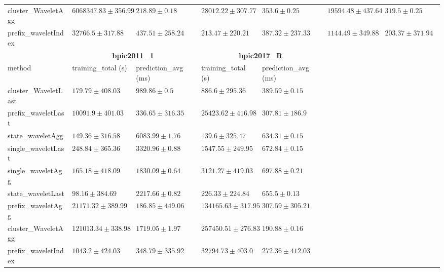 \documentclass[twoside,11pt]{Latex/Classes/PhDthesisPSnPDF}
\begin{document}
\begin{table}[h]
{\begin{tabular}{llllllll}
	cluster\_WaveletAgg & $6068347.83 \pm 356.99$ & $\mathbf{218.89 \pm 0.18}$ & $28012.22 \pm 307.77$ & $353.6 \pm 0.25$ & $19594.48 \pm 437.64$ & $319.5 \pm 0.25$ \\ 
	prefix\_waveletIndex & $32766.5 \pm 317.88$ & $437.51 \pm 258.24$ & $213.47 \pm 220.21$ & $387.32 \pm 237.33$ & $1144.49 \pm 349.88$ & $\mathbf{203.37 \pm 371.94}$ \\ 
	\bottomrule
	\toprule
	& \multicolumn{2}{c}{{\bfseries bpic2011\_1}} & \multicolumn{2}{c}{{\bfseries bpic2017\_R}} \\ \cmidrule(lr){2-3} \cmidrule(lr){4-5} \cmidrule(lr){6-7}
	method  & training\_total (s) & prediction\_avg (ms) & training\_total (s) & prediction\_avg (ms) \\ \midrule
	cluster\_WaveletLast & $179.79 \pm 408.03$ & $989.86 \pm 0.5$ & $886.6 \pm 295.36$ & $389.59 \pm 0.15$ \\ 
	prefix\_waveletLast & $10091.9 \pm 401.03$ & $336.65 \pm 316.35$ & $25423.62 \pm 416.98$ & $307.81 \pm 186.9$ \\ 
	state\_waveletAgg & $149.36 \pm 316.58$ & $6083.99 \pm 1.76$ & $\mathbf{139.6 \pm 325.47}$ & $634.31 \pm 0.15$ \\ 
	single\_waveletLast & $248.84 \pm 365.36$ & $3320.96 \pm 0.88$ & $1547.55 \pm 249.95$ & $672.84 \pm 0.15$ \\ 
	single\_waveletAgg & $165.18 \pm 418.09$ & $1830.09 \pm 0.64$ & $3121.27 \pm 419.03$ & $697.88 \pm 0.21$ \\ 
	state\_waveletLast & $\mathbf{98.16 \pm 384.69}$ & $2217.66 \pm 0.82$ & $226.33 \pm 224.84$ & $655.5 \pm 0.13$ \\ 
	prefix\_waveletAgg & $21171.32 \pm 389.99$ & $\mathbf{186.85 \pm 449.06}$ & $134165.63 \pm 317.95$ & $307.59 \pm 305.21$ \\ 
	cluster\_WaveletAgg & $121013.34 \pm 338.98$ & $1719.05 \pm 1.97$ & $257450.51 \pm 276.83$ & $\mathbf{190.88 \pm 0.16}$ \\ 
	prefix\_waveletIndex & $1043.2 \pm 424.03$ & $348.79 \pm 335.92$ & $32794.73 \pm 403.0$ & $272.36 \pm 412.03$ \\ 
	\bottomrule
	
	

		\end{tabular}%
	}	
\end{table}


\end{document}

